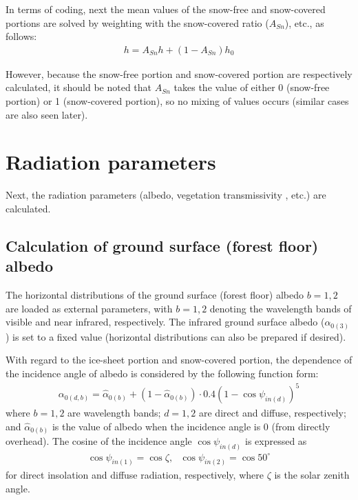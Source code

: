 In terms of coding, next the mean values of the snow-free and snow-covered portions are solved by weighting with the snow-covered ratio (\(A_{Sn}\)), etc., as follows: \begin{eqnarray}
    h = A_{Sn}h + (1-A_{Sn})h_0
\end{eqnarray}

However, because the snow-free portion and snow-covered portion are respectively calculated, it should be noted that \(A_{Sn}\) takes the value of either 0 (snow-free portion) or 1 (snow-covered
portion), so no mixing of values occurs (similar cases are also seen later).

\section{Radiation parameters}\label{radiation-parameters}

Next, the radiation parameters (albedo, vegetation transmissivity , etc.) are calculated.

\subsection{Calculation of ground surface (forest floor) albedo}\label{calculation-of-ground-surface-forest-floor-albedo}

The horizontal distributions of the ground surface (forest floor) albedo \(b=1,2\) are loaded as external parameters, with \(b=1,2\) denoting the wavelength bands of visible and near infrared,
respectively. The infrared ground surface albedo (\(\alpha_{0(3)}\)) is set to a fixed value (horizontal distributions can also be prepared if desired).

With regard to the ice-sheet portion and snow-covered portion, the dependence of the incidence angle of albedo is considered by the following function form: \begin{eqnarray}
 \alpha_{0(d,b)} = \hat{\alpha}_{0(b)} + ( 1 - \hat{\alpha}_{0(b)} )
                         \cdot 0.4 ( 1 - \cos \psi_{in(d)} )^5
\end{eqnarray} where \(b=1,2\) are wavelength bands; \(d=1,2\) are direct and diffuse, respectively; and \(\hat{\alpha}_{0(b)}\) is the value of albedo when the incidence angle is 0 (from directly overhead). The
cosine of the incidence angle \(\cos\psi_{in(d)}\) is expressed as \begin{eqnarray}
 \cos\psi_{in(1)} = \cos\zeta, \ \ \
 \cos\psi_{in(2)} = \cos 50^{\circ}
\end{eqnarray} for direct insolation and diffuse radiation, respectively, where \(\zeta\) is the solar zenith angle.

